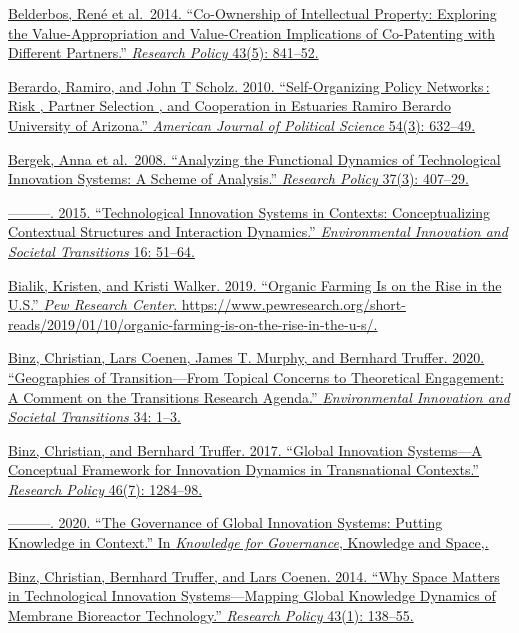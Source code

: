 \documentclass[twoside,12pt,final]{ucthesis-CA2012}
\begin{document}
\begin{ucmainmatter}
\href{https://www.zotero.org/google-docs/?hv36Bh}{Belderbos, René et al.~2014. ``Co-Ownership of Intellectual Property:
Exploring the Value-Appropriation and Value-Creation Implications of
Co-Patenting with Different Partners.'' \emph{Research Policy} 43(5):
841--52.}

\href{https://www.zotero.org/google-docs/?hv36Bh}{Berardo, Ramiro, and John T Scholz. 2010. ``Self-Organizing Policy
Networks\,: Risk , Partner Selection , and Cooperation in Estuaries
Ramiro Berardo University of Arizona.'' \emph{American Journal of Political
Science} 54(3): 632--49.}

\href{https://www.zotero.org/google-docs/?hv36Bh}{Bergek, Anna et al.~2008. ``Analyzing the Functional Dynamics of
Technological Innovation Systems: A Scheme of Analysis.'' \emph{Research
Policy} 37(3): 407--29.}

\href{https://www.zotero.org/google-docs/?hv36Bh}{---------. 2015. ``Technological Innovation Systems in Contexts:
Conceptualizing Contextual Structures and Interaction Dynamics.''
\emph{Environmental Innovation and Societal Transitions} 16:
51--64.}

\href{https://www.zotero.org/google-docs/?hv36Bh}{Bialik, Kristen, and Kristi Walker. 2019. ``Organic Farming Is on the
Rise in the U.S.'' \emph{Pew Research Center}.
https://www.pewresearch.org/short-reads/2019/01/10/organic-farming-is-on-the-rise-in-the-u-s/.}

\href{https://www.zotero.org/google-docs/?hv36Bh}{Binz, Christian, Lars Coenen, James T. Murphy, and Bernhard Truffer.
2020. ``Geographies of Transition---From Topical Concerns to Theoretical
Engagement: A Comment on the Transitions Research Agenda.''
\emph{Environmental Innovation and Societal Transitions} 34:
1--3.}

\href{https://www.zotero.org/google-docs/?hv36Bh}{Binz, Christian, and Bernhard Truffer. 2017. ``Global Innovation
Systems---A Conceptual Framework for Innovation Dynamics in
Transnational Contexts.'' \emph{Research Policy} 46(7):
1284--98.}

\href{https://www.zotero.org/google-docs/?hv36Bh}{---------. 2020. ``The Governance of Global Innovation Systems: Putting
Knowledge in Context.'' In \emph{Knowledge for Governance}, Knowledge and
Space,.}

\href{https://www.zotero.org/google-docs/?hv36Bh}{Binz, Christian, Bernhard Truffer, and Lars Coenen. 2014. ``Why Space
Matters in Technological Innovation Systems---Mapping Global Knowledge
Dynamics of Membrane Bioreactor Technology.'' \emph{Research Policy} 43(1):
138--55.}


\end{ucmainmatter}
\end{document}
